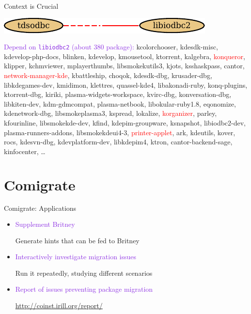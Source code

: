 \documentclass[xcolor={dvipsnames}]{beamer}
\newcommand{\ZZZ}[1]{\textcolor{red}{#1}}
\newcommand{\EEE}[1]{\textcolor{BlueViolet}{#1}}
\begin{document}
\begin{frame}{Context is Crucial}
\begin{center}
\includegraphics{libiodbc2}
\end{center}
\EEE{Depend on \texttt{libiodbc2} (about 380 package):}
kcolorchooser, kdesdk-misc, kdevelop-php-docs, blinken, kdevelop,
kmousetool, ktorrent, kalgebra, \ZZZ{konqueror}, klipper, kchmviewer,
mplayerthumbs, libsmokekutils3, kjots, ksshaskpass, cantor,
\ZZZ{network-manager-kde}, kbattleship, choqok, kdesdk-dbg, krusader-dbg,
libkdegames-dev, kmidimon, klettres, quassel-kde4, libakonadi-ruby,
konq-plugins, ktorrent-dbg, kiriki, plasma-widgets-workspace, kvirc-dbg,
konversation-dbg, libkiten-dev, kdm-gdmcompat, plasma-netbook,
libokular-ruby1.8, eqonomize, kdenetwork-dbg, libsmokeplasma3, kspread,
lokalize, \ZZZ{korganizer}, parley, kfourinline, libsmokekde-dev, kfind,
kdepim-groupware, ksnapshot, libiodbc2-dev, plasma-runners-addons,
libsmokekdeui4-3, \ZZZ{printer-applet}, ark, kdeutils, kover, rocs, kdesvn-dbg,
kdevplatform-dev, libkdepim4, ktron, cantor-backend-sage, kinfocenter,
\ldots

\end{frame}

\part{Comigrate}
\frame{\partpage}

\begin{frame}{Comigrate: Applications}

\begin{itemize}
\item \EEE{Supplement Britney}

Generate hints that can be fed to Britney

\vspace{0.5em}

\item \EEE{Interactively investigate migration issues}

Run it repeatedly, studying different scenarios

\vspace{0.5em}

\item \EEE{Report of issues preventing package migration}

\url{http://coinst.irill.org/report/}

\end{itemize}
\end{frame}
\end{document}
